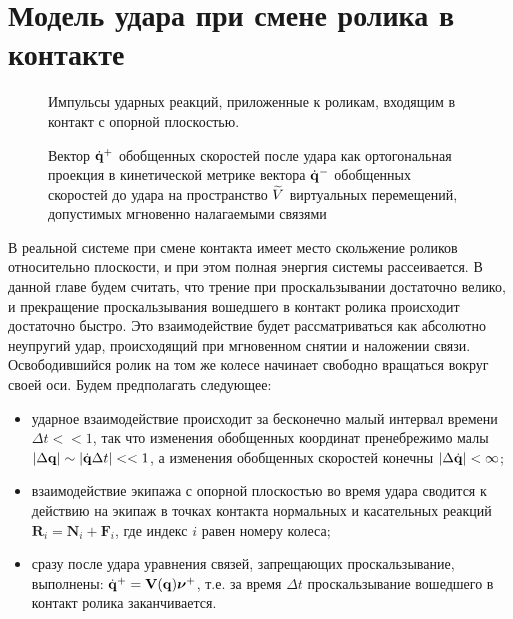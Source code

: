 \section{Модель удара при смене ролика в контакте}

\begin{center}
    \begin{figure}[ht]
            \centering
            \caption{Импульсы ударных реакций, приложенные к роликам, входящим в контакт с опорной плоскостью.}
            \label{fig:react}
        \endminipage
        \qquad
            \centering
            \caption{Вектор $\dot{\mathbf{q}}^+$ обобщенных скоростей после удара как ортогональная проекция в кинетической метрике вектора $\dot{\mathbf{q}}^-$ обобщенных скоростей до удара на пространство $\widetilde{V}$ виртуальных перемещений, допустимых мгновенно налагаемыми связями}
            \label{fig:project}
        \endminipage
    \end{figure}
\end{center}

В реальной системе при смене контакта имеет место скольжение роликов относительно плоскости, и при этом полная энергия системы рассеивается. В данной главе будем считать, что трение при проскальзывании достаточно велико, и прекращение проскальзывания вошедшего в контакт ролика происходит достаточно быстро. Это взаимодействие будет рассматриваться как абсолютно неупругий удар, происходящий при мгновенном снятии и наложении связи. Освободившийся ролик на том же колесе начинает свободно вращаться вокруг своей оси.
Будем предполагать следующее:
\begin{itemize}
    \item ударное взаимодействие происходит за бесконечно малый интервал времени $\Delta t << 1$, так что изменения обобщенных координат пренебрежимо малы $|\Delta \mathbf{q}| \sim |\dot{\mathbf{q}}\Delta t| << 1$, а изменения обобщенных скоростей конечны $|\Delta \dot{\mathbf{q}}| < \infty$;
    \item взаимодействие экипажа с опорной плоскостью во время удара сводится к действию на экипаж в точках контакта нормальных и касательных реакций $\mathbf{R}_i = \mathbf{N}_i + \mathbf{F}_i$, где индекс $i$ равен номеру колеса;
    \item сразу после удара 
    уравнения связей, запрещающих проскальзывание, выполнены: $\dot{\mathbf{q}}^+ = \mathbf{V}(\mathbf{q})\boldsymbol{\mathbf{\nu}}^+$, т.е. за время $\Delta t$ проскальзывание вошедшего в контакт ролика заканчивается.
\end{itemize}

